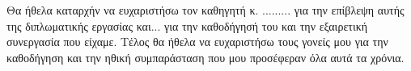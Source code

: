 \begin{acknowledgements}
Θα ήθελα καταρχήν να ευχαριστήσω τον καθηγητή κ. ......... για την επίβλεψη αυτής της διπλωματικής εργασίας και... για την καθοδήγησή του και την εξαιρετική συνεργασία που είχαμε. 
Τέλος θα ήθελα να ευχαριστήσω τους γονείς μου για την καθοδήγηση και την ηθική συμπαράσταση που μου προσέφεραν όλα αυτά τα χρόνια.
\end{acknowledgements}